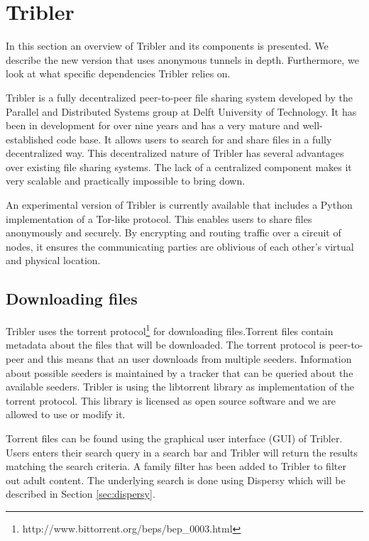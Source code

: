 
\section{Tribler}
	\label{scc:tribler}
	In this section an overview of Tribler and its components is presented. We describe the new version that uses anonymous tunnels in depth. Furthermore, we look at what specific dependencies Tribler relies on.

	Tribler is a fully decentralized peer-to-peer file sharing system developed by the Parallel and Distributed Systems group at Delft University of Technology. It has been in development for over nine years and has a very mature and well-established code base. It allows users to search for and share files in a fully decentralized way. This decentralized nature of Tribler has several advantages over existing file sharing systems. The lack of a centralized component makes it very scalable and practically impossible to bring down.

	An experimental version of Tribler is currently available that includes a Python implementation of a Tor-like protocol. This enables users to share files anonymously and securely. By encrypting and routing traffic over a circuit of nodes, it ensures the communicating parties are oblivious of each other's virtual and physical location.
	
	\subsection{Downloading files}
		Tribler uses the torrent protocol\footnote{http://www.bittorrent.org/beps/bep\_0003.html} for downloading files.Torrent files contain metadata about the files that will be downloaded. The torrent protocol is peer-to-peer and this means that an user downloads from multiple seeders. Information about possible seeders is maintained by a tracker that can be queried about the available seeders. Tribler is using the libtorrent library as implementation of the torrent protocol. This library is licensed as open source software and we are allowed to use or modify it.
		
		Torrent files can be found using the graphical user interface (GUI) of Tribler. Users enters their search query in a search bar and Tribler will return the results matching the search criteria. A family filter has been added to Tribler to filter out adult content. The underlying search is done using Dispersy which will be described in Section \ref{sec:dispersy}.
	
